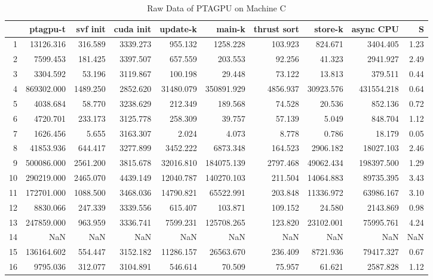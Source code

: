 \begin{table}[ht]
    \tiny
    \begin{tabular}{rrrrrrrrrr}
        \toprule
           & ptagpu-t   & svf init & cuda init & update-k  & main-k     & thrust sort & store-k   & async CPU  & S    \\
        \midrule
        1  & 13126.316  & 316.589  & 3339.273  & 955.132   & 1258.228   & 103.923     & 824.671   & 3404.405   & 1.23 \\
        2  & 7599.453   & 181.425  & 3397.507  & 657.559   & 203.553    & 92.256      & 41.323    & 2941.927   & 2.49 \\
        3  & 3304.592   & 53.196   & 3119.867  & 100.198   & 29.448     & 73.122      & 13.813    & 379.511    & 0.44 \\
        4  & 869302.000 & 1489.250 & 2852.620  & 31480.079 & 350891.929 & 4856.937    & 30923.576 & 431554.218 & 0.64 \\
        5  & 4038.684   & 58.770   & 3238.629  & 212.349   & 189.568    & 74.528      & 20.536    & 852.136    & 0.72 \\
        6  & 4720.701   & 233.173  & 3125.778  & 258.309   & 39.757     & 57.139      & 5.049     & 848.704    & 1.12 \\
        7  & 1626.456   & 5.655    & 3163.307  & 2.024     & 4.073      & 8.778       & 0.786     & 18.179     & 0.05 \\
        8  & 41853.936  & 644.417  & 3277.899  & 3452.222  & 6873.348   & 164.523     & 2906.182  & 18027.103  & 2.46 \\
        9  & 500086.000 & 2561.200 & 3815.678  & 32016.810 & 184075.139 & 2797.468    & 49062.434 & 198397.500 & 1.29 \\
        10 & 290219.000 & 2465.070 & 4439.149  & 12040.787 & 140270.103 & 211.504     & 14064.883 & 89735.395  & 3.43 \\
        11 & 172701.000 & 1088.500 & 3468.036  & 14790.821 & 65522.991  & 203.848     & 11336.972 & 63986.167  & 3.10 \\
        12 & 8830.066   & 247.339  & 3339.556  & 615.407   & 103.871    & 109.152     & 24.580    & 2143.869   & 0.98 \\
        13 & 247859.000 & 963.959  & 3336.741  & 7599.231  & 125708.265 & 123.820     & 23102.001 & 75995.761  & 4.24 \\
        14 & NaN        & NaN      & NaN       & NaN       & NaN        & NaN         & NaN       & NaN        & NaN  \\
        15 & 136164.602 & 554.447  & 3152.182  & 11286.157 & 26563.670  & 236.409     & 8721.936  & 79417.327  & 0.67 \\
        16 & 9795.036   & 312.077  & 3104.891  & 546.614   & 70.509     & 75.957      & 61.621    & 2587.828   & 1.12 \\
        \bottomrule
    \end{tabular}
    \caption{Raw Data of PTAGPU on Machine C}
\end{table}
\normalsize

